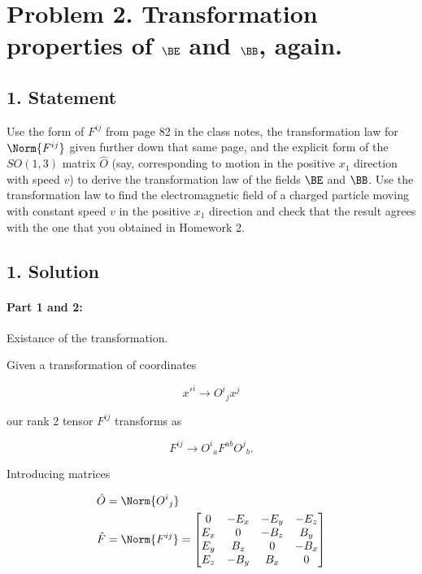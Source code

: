 \section{Problem 2.  Transformation properties of $\BE$ and $\BB$, again.}
\subsection{1. Statement}

Use the form of $F^{i j}$ from page 82 in the class notes, the transformation law for $\Norm{ F^{i j} }$ given further down that same page, and the explicit form of the $SO(1,3)$ matrix $\hat{O}$ (say, corresponding to motion in the positive $x_1$ direction with speed $v$) to derive the transformation law of the fields $\BE$ and $\BB$.  Use the transformation law to find the electromagnetic field of a charged particle moving with constant speed $v$ in the positive $x_1$ direction and check that the result agrees with the one that you obtained in Homework 2.

\subsection{1. Solution}

\paragraph{Part 1 and 2:} Existance of the transformation.

Given a transformation of coordinates 

\begin{equation}\label{eqn:relElectroDynProblemSet3:1220}
{x'}^i \rightarrow {O^i}_j x^j
\end{equation}

our rank 2 tensor $F^{i j}$ transforms as

\begin{equation}\label{eqn:relElectroDynProblemSet3:1240}
F^{i j} \rightarrow 
{O^i}_a
F^{a b}
{O^j}_b.
\end{equation}

Introducing matrices

\begin{align}\label{eqn:relElectroDynProblemSet3:1260}
\hat{O} &= \Norm{{O^i}_j} \\
\hat{F} &= 
\Norm{F^{ij}} = 
\begin{bmatrix}
0 & -E_x & -E_y & -E_z \\
E_x & 0 & -B_z & B_y \\
E_y & B_z & 0 & -B_x \\
E_z & -B_y & B_x & 0
\end{bmatrix} 
\end{align}

